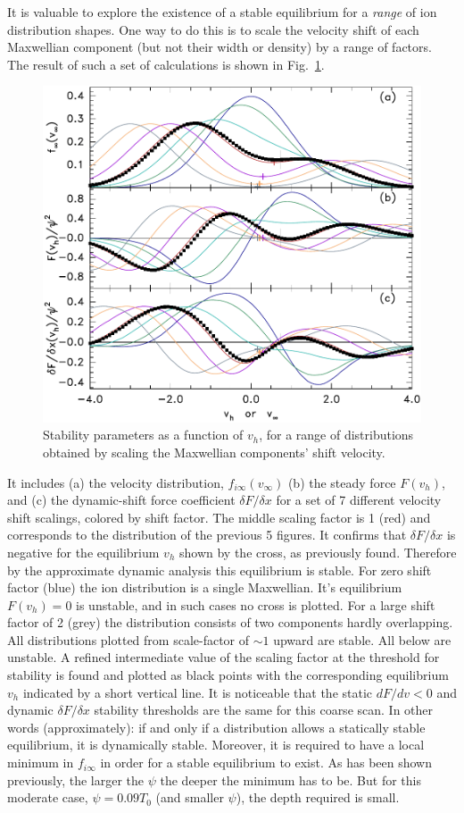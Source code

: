 \documentclass[12pt]{article}
\begin{document}
It is valuable to explore the existence of a stable equilibrium for a
\emph{range} of ion distribution shapes. One way to do this is to
scale the velocity shift of each Maxwellian component (but not their
width or density) by a range of factors. The result of such a set of
calculations is shown in Fig.\ \ref{fig:dynamic}.
\begin{figure}[htp]
  \centering
  \includegraphics[width=.6\hsize]{dynamic}
  \caption{Stability parameters as a function of $v_h$, for a range of
    distributions obtained by scaling the Maxwellian components' shift
    velocity.}
  \label{fig:dynamic}
\end{figure}
It includes (a) the velocity distribution, $f_{i\infty}(v_{\infty})$
(b) the steady force $F(v_h)$, and (c) the dynamic-shift force
coefficient $\delta F/\delta x$ for a set of 7 different velocity
shift scalings, colored by shift factor. The middle scaling factor is
1 (red) and corresponds to the distribution of the previous 5
figures. It confirms that $\delta F/\delta x$ is negative for the
equilibrium $v_h$ shown by the cross, as previously found. Therefore
by the approximate dynamic analysis this equilibrium is stable. For
zero shift factor (blue) the ion distribution is a single
Maxwellian. It's equilibrium $F(v_h)=0$ is unstable, and in such cases
no cross is plotted. For a large shift factor of 2 (grey) the
distribution consists of two components hardly overlapping. All
distributions plotted from scale-factor of $\sim1$ upward are
stable. All below are unstable. A refined intermediate value of the
scaling factor at the threshold for stability is found and plotted as
black points with the corresponding equilibrium $v_h$ indicated by a
short vertical line.  It is noticeable that the static $dF/dv<0$ and
dynamic $\delta F/\delta x$ stability thresholds are the same for this
coarse scan. In other words (approximately): if and only if a
distribution allows a statically stable equilibrium, it is dynamically
stable. Moreover, it is required to have a local minimum in
$f_{i\infty}$ in order for a stable equilibrium to exist. As has been
shown previously\cite{Hutchinson2021c}, the larger the $\psi$ the
deeper the minimum has to be. But for this moderate case,
$\psi=0.09 T_0$ (and smaller $\psi$), the depth required is small.
\end{document}
